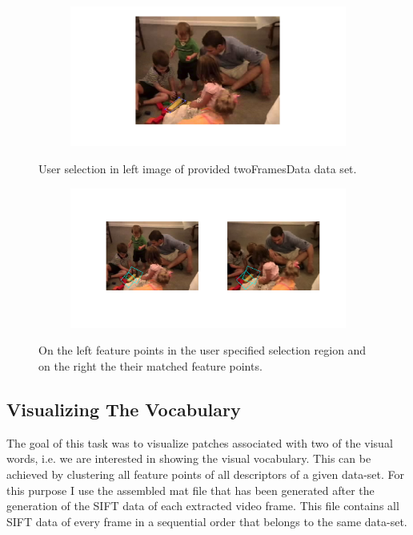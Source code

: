 \documentclass{paper}
\begin{document}
\begin{figure}[H]
\centering
\begin{subfigure}{1.0\textwidth}
\includegraphics[width=\textwidth]{figures/raw_matches/kids/selMatch2}
\end{subfigure}
\caption{User selection in left image of provided twoFramesData data set.}
\label{fig:kids2_raw_sel}
\end{figure}

\begin{figure}[H]
\centering
\begin{subfigure}{1.0\textwidth}
\includegraphics[width=\textwidth]{figures/raw_matches/kids/match2}
\end{subfigure}
\caption{On the left feature points in the user specified selection region and on the right the their matched feature points.}
\label{fig:kids_raw_matching}
\end{figure}



\subsection{Visualizing The Vocabulary}

The goal of this task was to visualize patches associated with two of the visual words, i.e. we are interested in showing the visual vocabulary. This can be achieved by clustering all feature points of all descriptors of a given data-set. For this purpose I use the assembled mat file that has been generated after the generation of the SIFT data of each extracted video frame. This file contains all SIFT data of every frame in a sequential order that belongs to the same data-set. \\
\end{document}
